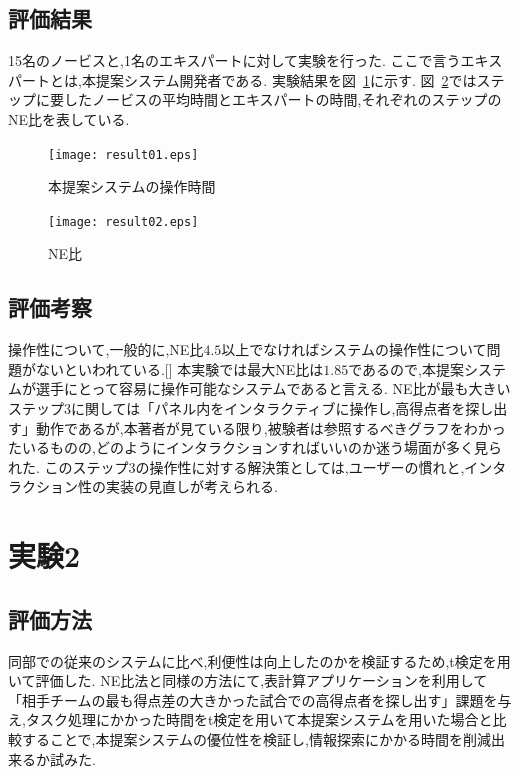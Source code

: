 \documentclass[sotsuron]{kuee}
\begin{document}
		\subsection{評価結果}
			15名のノービスと,1名のエキスパートに対して実験を行った.
			ここで言うエキスパートとは,本提案システム開発者である.
			実験結果を図~\ref{fig:result01}に示す.
			図~\ref{fig:result02}ではステップに要したノービスの平均時間とエキスパートの時間,それぞれのステップのNE比を表している.
			\begin{figure}
				\begin{center}
					\texttt{[image: result01.eps]}
				\end{center}
				\caption{本提案システムの操作時間}
		  		\label{fig:result01}
			\end{figure}
			\begin{figure}
				\begin{center}
					\texttt{[image: result02.eps]}
				\end{center}
				\caption{NE比}
		  		\label{fig:result02}
			\end{figure}
		\subsection{評価考察}
			操作性について,一般的に,NE比$4.5$以上でなければシステムの操作性について問題がないといわれている.[]
			本実験では最大NE比は$1.85$であるので,本提案システムが選手にとって容易に操作可能なシステムであると言える.
			NE比が最も大きいステップ3に関しては「パネル内をインタラクティブに操作し,高得点者を探し出す」動作であるが,本著者が見ている限り,被験者は参照するべきグラフをわかったいるものの,どのようにインタラクションすればいいのか迷う場面が多く見られた.
			このステップ3の操作性に対する解決策としては,ユーザーの慣れと,インタラクション性の実装の見直しが考えられる.
	\section{実験2}
		\subsection{評価方法}
			同部での従来のシステムに比べ,利便性は向上したのかを検証するため,t検定を用いて評価した.
			NE比法と同様の方法にて,表計算アプリケーションを利用して「相手チームの最も得点差の大きかった試合での高得点者を探し出す」課題を与え,タスク処理にかかった時間をt検定を用いて本提案システムを用いた場合と比較することで,本提案システムの優位性を検証し,情報探索にかかる時間を削減出来るか試みた.
\end{document}

